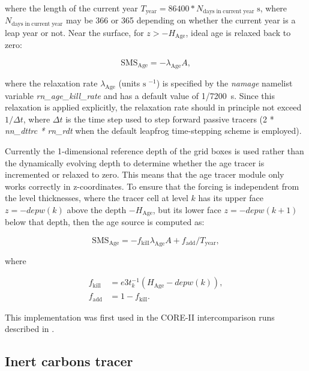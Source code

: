 \documentclass[../main/TOP_manual]{subfiles}
\begin{document}
where the length of the current year $T_{\mathrm{year}} = 86400*N_{\mathrm{days\;in\;current\; year}}\;\mathrm{s}$, where $N_{\mathrm{days\;in\;current\; year}}$ may be 366 or 365 depending on whether the current year is a leap year or not.
Near the surface, for $z>-H_{\mathrm{Age}}$, ideal age is relaxed back to zero:

\begin{equation}
  \label{eq:TOP-age-surface}
   \mathrm{SMS_{\mathrm{Age}}} = -\lambda_{\mathrm{Age}}A,
\end{equation}

where the relaxation rate $\lambda_{\mathrm{Age}}$  (units $\mathrm{s}\;^{-1}$) is specified by the \textit{namage} namelist variable \textit{rn\_age\_kill\_rate} and has a default value of 1/7200~s.
Since this relaxation is applied explicitly, the relaxation rate should in principle not exceed $1/\Delta t$, where $\Delta t$ is the time step used to step forward passive tracers (2 * \textit{nn\_dttrc * rn\_rdt} when the default  leapfrog time-stepping scheme is employed).

Currently the 1-dimensional reference depth of the grid boxes is used rather than the dynamically evolving depth to determine whether the age tracer is incremented or relaxed to zero.
This means that the age tracer module only works correctly in z-coordinates.
To ensure that the forcing is independent from the level thicknesses, where the tracer cell at level $k$ has its upper face $z=-depw(k)$ above the depth $-H_{\mathrm{Age}}$, but its lower face $z=-depw(k+1)$ below that depth, then the age source is computed as:

\begin{equation}
  \label{eq:TOP-age-mixed}
   \mathrm{SMS_{\mathrm{Age}}} = -f_{\mathrm{kill}}\lambda_{\mathrm{Age}}A +f_{\mathrm{add}}/T_{\mathrm{year}} ,
\end{equation}

where

\begin{align}
    f_{\mathrm{kill}} &= e3t_k^{-1}(H_{\mathrm{Age}} - depw(k)) , \\
    f_{\mathrm{add}} &= 1 - f_{\mathrm{kill}}.
\end{align}

This implementation was first used in the CORE-II intercomparison runs described in \citet{danabasoglu_2014}.

\subsection{Inert carbons tracer}
\end{document}

